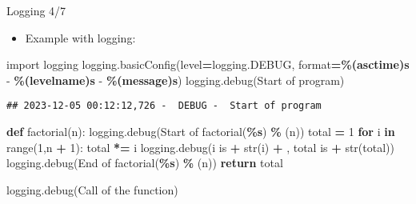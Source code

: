 \documentclass[
  8pt,
  ignorenonframetext,
]{beamer}
\newenvironment{Shaded}{\begin{snugshade}}{\end{snugshade}}
\newcommand{\BuiltInTok}[1]{#1}
\newcommand{\ControlFlowTok}[1]{\textcolor[rgb]{0.13,0.29,0.53}{\textbf{#1}}}
\newcommand{\DecValTok}[1]{\textcolor[rgb]{0.00,0.00,0.81}{#1}}
\newcommand{\ImportTok}[1]{#1}
\newcommand{\KeywordTok}[1]{\textcolor[rgb]{0.13,0.29,0.53}{\textbf{#1}}}
\newcommand{\NormalTok}[1]{#1}
\newcommand{\OperatorTok}[1]{\textcolor[rgb]{0.81,0.36,0.00}{\textbf{#1}}}
\newcommand{\SpecialCharTok}[1]{\textcolor[rgb]{0.81,0.36,0.00}{\textbf{#1}}}
\newcommand{\StringTok}[1]{\textcolor[rgb]{0.31,0.60,0.02}{#1}}
\providecommand{\tightlist}{%
  \setlength{\itemsep}{0pt}\setlength{\parskip}{0pt}}
\begin{document}
\begin{frame}[fragile]{Logging 4/7}
\protect\hypertarget{logging-47}{}
\begin{itemize}
\tightlist
\item
  Example with logging:
\end{itemize}

\begin{Shaded}
\begin{Highlighting}[]
\ImportTok{import}\NormalTok{ logging}
\NormalTok{logging.basicConfig(level}\OperatorTok{=}\NormalTok{logging.DEBUG, }\BuiltInTok{format}\OperatorTok{=}\StringTok{\textquotesingle{}}\SpecialCharTok{\%(asctime)s}\StringTok{ {-}  }\SpecialCharTok{\%(levelname)s}\StringTok{ {-}  }\SpecialCharTok{\%(message)s}\StringTok{\textquotesingle{}}\NormalTok{)}
\NormalTok{logging.debug(}\StringTok{\textquotesingle{}Start of program\textquotesingle{}}\NormalTok{)}
\end{Highlighting}
\end{Shaded}

\begin{verbatim}
## 2023-12-05 00:12:12,726 -  DEBUG -  Start of program
\end{verbatim}

\begin{Shaded}
\begin{Highlighting}[]
\KeywordTok{def}\NormalTok{ factorial(n):}
\NormalTok{    logging.debug(}\StringTok{\textquotesingle{}Start of factorial(}\SpecialCharTok{\%s}\StringTok{)\textquotesingle{}}  \OperatorTok{\%}\NormalTok{ (n))}
\NormalTok{    total }\OperatorTok{=} \DecValTok{1}
    \ControlFlowTok{for}\NormalTok{ i }\KeywordTok{in} \BuiltInTok{range}\NormalTok{(}\DecValTok{1}\NormalTok{,n }\OperatorTok{+} \DecValTok{1}\NormalTok{):}
\NormalTok{        total }\OperatorTok{*=}\NormalTok{ i}
\NormalTok{        logging.debug(}\StringTok{\textquotesingle{}i is \textquotesingle{}} \OperatorTok{+} \BuiltInTok{str}\NormalTok{(i) }\OperatorTok{+} \StringTok{\textquotesingle{}, total is \textquotesingle{}} \OperatorTok{+} \BuiltInTok{str}\NormalTok{(total))}
\NormalTok{    logging.debug(}\StringTok{\textquotesingle{}End of factorial(}\SpecialCharTok{\%s}\StringTok{)\textquotesingle{}}  \OperatorTok{\%}\NormalTok{ (n))}
    \ControlFlowTok{return}\NormalTok{ total}

\NormalTok{logging.debug(}\StringTok{\textquotesingle{}Call of the function\textquotesingle{}}\NormalTok{)}
\end{Highlighting}
\end{Shaded}


\end{frame}
\end{document}
